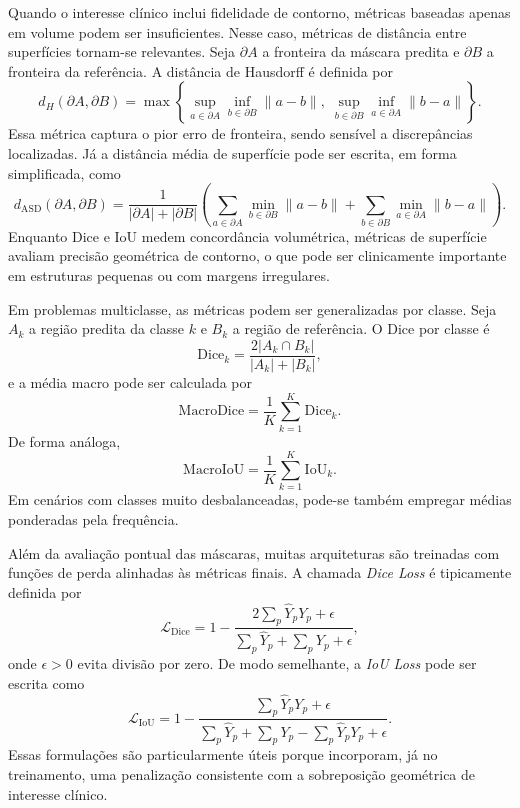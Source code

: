 \documentclass[tcc,capa]{texufpel}
\begin{document}
Quando o interesse clínico inclui fidelidade de contorno, métricas baseadas apenas em volume podem ser insuficientes. Nesse caso, métricas de distância entre superfícies tornam-se relevantes. Seja \(\partial A\) a fronteira da máscara predita e \(\partial B\) a fronteira da referência. A distância de Hausdorff é definida por
\begin{equation}
	d_H(\partial A,\partial B)
	=
	\max\left\{
	\sup_{a\in \partial A}\inf_{b\in \partial B} \|a-b\|,
	\;
	\sup_{b\in \partial B}\inf_{a\in \partial A} \|b-a\|
	\right\}.
\end{equation}
Essa métrica captura o pior erro de fronteira, sendo sensível a discrepâncias localizadas. Já a distância média de superfície pode ser escrita, em forma simplificada, como
\begin{equation}
	d_{\text{ASD}}(\partial A,\partial B)
	=
	\frac{1}{|\partial A| + |\partial B|}
	\left(
	\sum_{a\in \partial A}\min_{b\in \partial B}\|a-b\|
	+
	\sum_{b\in \partial B}\min_{a\in \partial A}\|b-a\|
	\right).
\end{equation}
Enquanto Dice e IoU medem concordância volumétrica, métricas de superfície avaliam precisão geométrica de contorno, o que pode ser clinicamente importante em estruturas pequenas ou com margens irregulares.

Em problemas multiclasse, as métricas podem ser generalizadas por classe. Seja \(A_k\) a região predita da classe \(k\) e \(B_k\) a região de referência. O Dice por classe é
\begin{equation}
	\mathrm{Dice}_k
	=
	\frac{2|A_k \cap B_k|}{|A_k| + |B_k|},
\end{equation}
e a média macro pode ser calculada por
\begin{equation}
	\mathrm{MacroDice}
	=
	\frac{1}{K}\sum_{k=1}^{K}\mathrm{Dice}_k.
\end{equation}
De forma análoga,
\begin{equation}
	\mathrm{MacroIoU}
	=
	\frac{1}{K}\sum_{k=1}^{K}\mathrm{IoU}_k.
\end{equation}
Em cenários com classes muito desbalanceadas, pode-se também empregar médias ponderadas pela frequência.

Além da avaliação pontual das máscaras, muitas arquiteturas são treinadas com funções de perda alinhadas às métricas finais. A chamada \textit{Dice Loss} é tipicamente definida por
\begin{equation}
	\mathcal{L}_{\text{Dice}}
	=
	1 - \frac{2\sum_{p} \hat{Y}_p Y_p + \epsilon}
	{\sum_{p}\hat{Y}_p + \sum_{p}Y_p + \epsilon},
\end{equation}
onde \(\epsilon>0\) evita divisão por zero. De modo semelhante, a \textit{IoU Loss} pode ser escrita como
\begin{equation}
	\mathcal{L}_{\text{IoU}}
	=
	1 - \frac{\sum_{p}\hat{Y}_p Y_p + \epsilon}
	{\sum_{p}\hat{Y}_p + \sum_{p}Y_p - \sum_{p}\hat{Y}_p Y_p + \epsilon}.
\end{equation}
Essas formulações são particularmente úteis porque incorporam, já no treinamento, uma penalização consistente com a sobreposição geométrica de interesse clínico.
\end{document}
